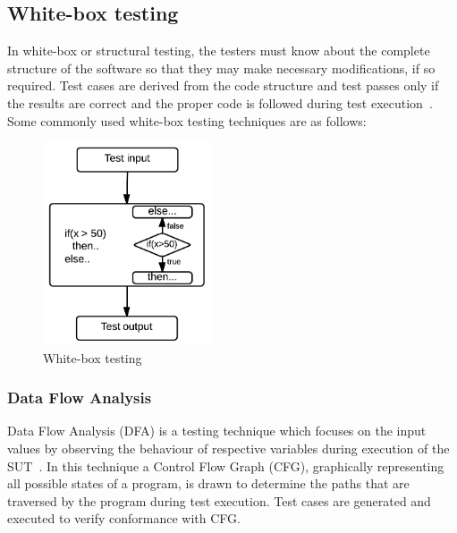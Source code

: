 \subsection{White-box testing}
In white-box or structural testing, the testers must know about the complete structure of the software so that they may make necessary modifications, if so required. Test cases are derived from the code structure and test passes only if the results are correct and the proper code is followed during test execution~\cite{ostrand2002white}. Some commonly used white-box testing techniques are as follows:
\begin{figure}[h]
\begin{center}
	\includegraphics[width=5cm, height=6cm ]{chapter2/whiteBox.png}
	\caption{White-box testing}
	\label{fig:blackBox}
\end{center}  
\end{figure}
%  

\subsubsection{Data Flow Analysis}
Data Flow Analysis (DFA) is a testing technique which focuses on the input values by observing the behaviour of respective variables during execution of the SUT~\cite{clarke1989formal}. In this technique a Control Flow Graph (CFG), graphically representing all possible states of a program, is drawn to determine the paths that are traversed by the program during test execution. Test cases are generated and executed to verify conformance with CFG. 

